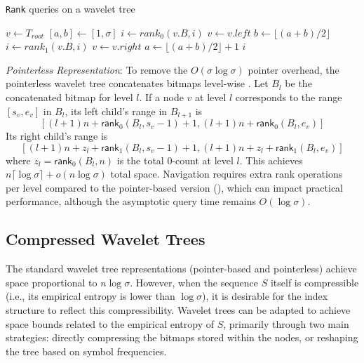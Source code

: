 \begin{algorithm}[h!]
    \caption{\texttt{Rank} queries on a wavelet tree}\label{alg:rank_wt}
    \begin{algorithmic}
        \State $v \gets T_{root}$ 
        \State $[a,b] \gets [1,\sigma]$
        \State $i \gets rank_0(v.B,i)$
        \State $v \gets v.left$ 
        \State $b \gets \lfloor (a+b)/2 \rfloor$
        \Else
        \State $i \gets rank_1(v.B,i)$
        \State $v \gets v.right$ 
        \State $a \gets \lfloor (a+b)/2 \rfloor +1$
        \EndIf
        \EndWhile
        \State \Return $i$
        \EndFunction
    \end{algorithmic}
\end{algorithm}

\emph{Pointerless Representation}: To remove the $O(\sigma \log \sigma)$ pointer overhead, the pointerless wavelet tree concatenates bitmaps level-wise \cite{MAKINEN2007332, MAKINEN2006703}. Let $B_l$ be the concatenated bitmap for level $l$. If a node $v$ at level $l$ corresponds to the range $[s_v, e_v]$ in $B_l$, its left child's range in $B_{l+1}$ is
\[
    [(l+1)n + \textsf{rank}_0(B_l, s_v-1) + 1, (l+1)n + \textsf{rank}_0(B_l, e_v)]
\]
Its right child's range is
\[
    [(l+1)n + z_l + \textsf{rank}_1(B_l, s_v-1) + 1, (l+1)n + z_l + \textsf{rank}_1(B_l, e_v)]
\]
where $z_l = \textsf{rank}_0(B_l, n)$ is the total $0$-count at level $l$. This achieves $n \lceil \log \sigma \rceil + o(n \log \sigma)$ total space. Navigation requires extra \textsf{rank} operations per level compared to the pointer-based version (\cite{claude2015wavelet}), which can impact practical performance, although the asymptotic query time remains $O(\log \sigma)$.

\subsection{Compressed Wavelet Trees} \label{sec:compressed_WT}

The standard wavelet tree representations (pointer-based and pointerless) achieve space proportional to $n \log \sigma$. However, when the sequence $S$ itself is compressible (i.e., its empirical entropy is lower than $\log \sigma$), it is desirable for the index structure to reflect this compressibility. Wavelet trees can be adapted to achieve space bounds related to the empirical entropy of $S$, primarily through two main strategies: directly compressing the bitmaps stored within the nodes, or reshaping the tree based on symbol frequencies.

